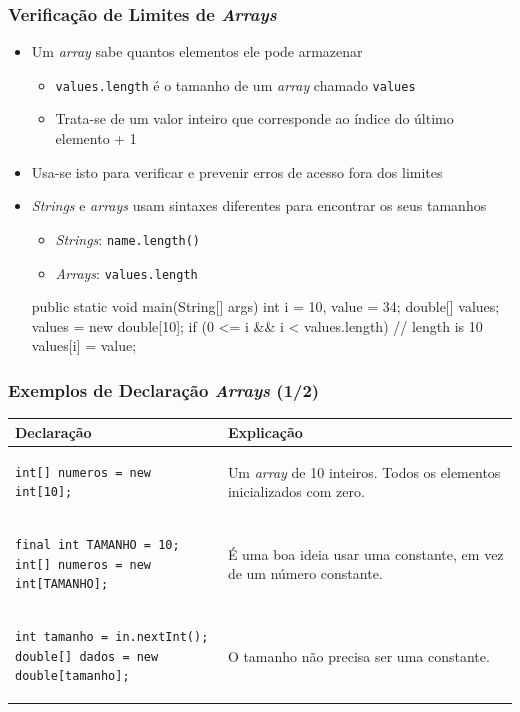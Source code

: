 \documentclass[xcolor={dvipsnames,table},aspectratio=169]{beamer}
\begin{document}
\begin{frame}[fragile]\frametitle{Verificação de Limites de \emph{Arrays}}
\begin{itemize}
	\item Um \emph{array} sabe quantos elementos ele pode armazenar
	\begin{itemize}
		\item \texttt{values.length} é o tamanho de um \emph{array} chamado \texttt{values}
		\item Trata-se de um valor inteiro que corresponde ao índice do último elemento + 1
	\end{itemize}
	\item Usa-se isto para verificar e prevenir erros de acesso fora dos limites
	\item \emph{Strings} e \emph{arrays} usam sintaxes diferentes para encontrar os seus tamanhos
	\begin{itemize}
		\item \emph{Strings}: \texttt{name.length()}
		\item \emph{Arrays}: \texttt{values.length}
	\end{itemize}
{\scriptsize
\begin{javacode}
public static void main(String[] args) {
  int i = 10, value = 34;
  double[] values;
  values = new double[10];
  if (0 <= i && i < values.length) {  // length is 10
    values[i] = value; 
  }
}
\end{javacode}
}
\end{itemize}
\end{frame}

\begin{frame}[fragile]\frametitle{Exemplos de Declaração \emph{Arrays} (1/2)}
{\scriptsize
\begin{center}
  \begin{tabular}{|p{8cm}|p{5cm}|}
\hline
    \textbf{Declaração} & \textbf{Explicação} \\
\hline
{\scriptsize
\begin{verbatim}
int[] numeros = new int[10];
\end{verbatim}
}
& Um \emph{array} de 10 inteiros. Todos os elementos inicializados com zero.\\
\hline
{\scriptsize
\begin{verbatim}
final int TAMANHO = 10;
int[] numeros = new int[TAMANHO];
\end{verbatim}
}
& É uma boa ideia usar uma constante, em vez de um número constante.\\
\hline
{\scriptsize
\begin{verbatim}
int tamanho = in.nextInt();
double[] dados = new double[tamanho];
\end{verbatim}
}
& O tamanho não precisa ser uma constante.\\
\hline
  \end{tabular}
\end{center}
}
\end{frame}
\end{document}
